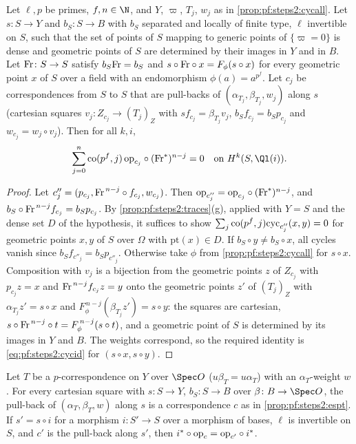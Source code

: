 \begin{proposition}\label{prop:pf:steps2:espt}
Let $\ell,p$ be primes, $f,n\in\N$, and $Y$, $\varpi$, $T_j$, $w_j$ as in \cref{prop:pf:steps2:cycall}.
Let $s\colon S\to Y$ and $b_S\colon S\to B$ with $b_S$ separated and locally of finite type, $\ell$
invertible on $S$, such that the set of points of $S$ mapping to generic points of $\{\varpi=0\}$ is
dense and geometric points of $S$ are determined by their images in $Y$ and in $B$. Let
$\mathrm{Fr}\colon S\to S$ satisfy $b_S\mathrm{Fr}=b_S$ and $s\circ\mathrm{Fr}\circ x=F_\phi(s\circ x)$ for
every geometric point $x$ of $S$ over a field with an endomorphism $\phi(a)=a^{p^f}$. Let $c_j$ be
correspondences from $S$ to $S$ that are pull-backs of $(\alpha_{T_j},\beta_{T_j},w_j)$ along $s$
(cartesian squares $v_j\colon Z_{c_j}\to(T_j)_Z$ with $sf_{c_j}=\beta_{T_j}v_j$,
$b_Sf_{c_j}=b_Sp_{c_j}$ and $w_{c_j}=w_j\circ v_j$). Then for all $k,i$,
\[
  \sum_{j=0}^n\stepsiico(p^f,j)\,\stepsiiop_{c_j}\circ(\stepsiiFr^\ast)^{n-j}=0
  \quad\text{on }H^k(S,\Ql(i)).
\]
\end{proposition}

\begin{proof}
Let $c''_j=(p_{c_j},\mathrm{Fr}^{\,n-j}\circ f_{c_j},w_{c_j})$. Then
$\mathrm{op}_{c''_j}=\mathrm{op}_{c_j}\circ(\mathrm{Fr}^\ast)^{n-j}$, and
$b_S\circ\mathrm{Fr}^{\,n-j}f_{c_j}=b_Sp_{c_j}$. By \cref{prop:pf:steps2:traces}(g), applied with $Y=S$
and the dense set $D$ of the hypothesis, it suffices to show
$\sum_j\mathrm{co}(p^f,j)\mathrm{cyc}_{c''_j}(x,y)=0$ for geometric points $x,y$ of $S$ over $\Omega$ with
$\mathrm{pt}(x)\in D$. If $b_S\circ y\ne b_S\circ x$, all cycles vanish since
$b_Sf_{c''_j}=b_Sp_{c''_j}$. Otherwise take $\phi$ from \cref{prop:pf:steps2:cycall} for $s\circ x$.
Composition with $v_j$ is a bijection from the geometric points $z$ of $Z_{c_j}$ with $p_{c_j}z=x$ and
$\mathrm{Fr}^{\,n-j}f_{c_j}z=y$ onto the geometric points $z'$ of $(T_j)_Z$ with $\alpha_{T_j}z'=s\circ x$
and $F_\phi^{\,n-j}(\beta_{T_j}z')=s\circ y$: the squares are cartesian,
$s\circ\mathrm{Fr}^{\,n-j}\circ t=F_\phi^{\,n-j}(s\circ t)$, and a geometric point of $S$ is determined by
its images in $Y$ and $B$. The weights correspond, so the required identity is
\eqref{eq:pf:steps2:cycid} for $(s\circ x,s\circ y)$.
\end{proof}

\begin{lemma}\label{lem:pf:steps2:corrpull}
Let $T$ be a $p$-correspondence on $Y$ over $\Spec O$ ($u\beta_T=u\alpha_T$) with an
$\alpha_T$-weight $w$. For every cartesian square with $s\colon S\to Y$, $b_S\colon S\to B$ over
$\beta\colon B\to\Spec O$, the pull-back of $(\alpha_T,\beta_T,w)$ along $s$ is a correspondence $c$ as
in \cref{prop:pf:steps2:espt}. If $s'=s\circ i$ for a morphism $i\colon S'\to S$ over a morphism of
bases, $\ell$ is invertible on $S$, and $c'$ is the pull-back along $s'$, then
$i^\ast\circ\mathrm{op}_c=\mathrm{op}_{c'}\circ i^\ast$.
\end{lemma}

